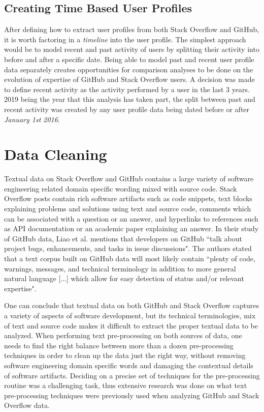     \subsection{Creating Time Based User Profiles\label{past_recent_full_segm}}
        After defining how to extract user profiles from both Stack Overflow and GitHub, it is worth factoring in a \textit{timeline} into the user profile. The simplest approach would be to model recent and past activity of users by splitting their activity into before and after a specific date. Being able to model past and recent user profile data separately creates opportunities for comparison analyses to be done on the evolution of expertise of GitHub and Stack Overflow users. A decision was made to define recent activity as the activity performed by a user in the last 3 years. 2019 being the year that this analysis has taken part, the split between past and recent activity was created by any user profile data being dated before or after \textit{January 1st 2016}.
        

\section{Data Cleaning\label{data_cleaning}}

    Textual data on Stack Overflow and GitHub contains a large variety of software engineering related domain specific wording mixed with source code. Stack Overflow posts contain rich software artifacts such as code snippets, text blocks explaining problems and solutions using text and source code, comments which can be associated with a question or an answer, and hyperlinks to references such as API documentation or an academic paper explaining an answer. In their study of GitHub data, Liao et al. \cite{liao2019status} mentions that developers on GitHub ``talk about project bugs, enhancements, and tasks in issue discussions". The authors stated that a text corpus built on GitHub data will most likely contain ``plenty of code, warnings, messages, and technical terminology in addition to more general natural language [...] which allow for easy detection of status and/or relevant expertise".
    
    One can conclude that textual data on both GitHub and Stack Overflow captures a variety of aspects of software development, but its technical terminologies, mix of text and source code makes it difficult to extract the proper textual data to be analyzed. When performing text pre-processing on both sources of data, one needs to find the right balance between more than a dozen pre-processing techniques in order to clean up the data just the right way, without removing software engineering domain specific words and damaging the contextual details of software artifacts. Deciding on a precise set of techniques for the pre-processing routine was a challenging task, thus extensive research was done on what text pre-processing techniques were previously used when analyzing GitHub and Stack Overflow data.
    
